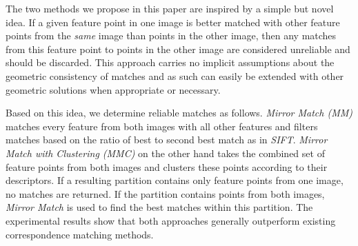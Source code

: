 The two methods we propose in this paper are inspired by a simple but 
novel idea. If a given feature point in one image is better matched with 
other feature points from the \emph{same} image than points in the other 
image, then any matches from this feature point to points in the other 
image are considered unreliable and should be discarded.  This approach 
carries no implicit assumptions about the geometric consistency of 
matches and as such can easily be extended with other geometric 
solutions when appropriate or necessary.

Based on this idea,  we determine reliable matches as follows. 
\emph{Mirror Match (MM)} matches every feature from both images with all 
other features and filters matches based on the ratio of best to second 
best match as in \emph{SIFT}. \emph{Mirror Match with Clustering (MMC)} 
on the other hand takes the combined set of feature points from both 
images and clusters these points according to their descriptors.  If a 
resulting partition contains only feature points from one image, no 
matches are returned.  If the partition contains points from both 
images, \emph{Mirror Match} is used to find the best matches within this 
partition.  The experimental results show that both approaches generally 
outperform existing correspondence matching methods.
